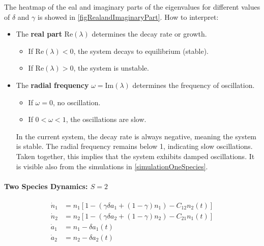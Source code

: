 \documentclass[11pt,a4paper,fleqn]{scrartcl}
\begin{document}
The heatmap of the eal and imaginary parts of the eigenvalues for different values of $\delta$ and $\gamma$ is showed in \ref{figRealandImaginaryPart}.
How to interpret:
\begin{itemize}
    \item The \textbf{real part} $\text{Re}(\lambda)$ determines the decay rate or growth.
        \begin{itemize}
            \item If $\text{Re}(\lambda) < 0$, the system decays to equilibrium (stable).
            \item If $\text{Re}(\lambda) > 0$, the system is unstable.
        \end{itemize}
    \item The \textbf{radial frequency} $\omega = \text{Im}(\lambda)$ determines the frequency of oscillation.
        \begin{itemize}
            \item If $\omega = 0$, no oscillation.
            \item If $0 < \omega < 1$, the oscillations are slow.
        \end{itemize}
In the current system, the decay rate is always negative, meaning the system is stable. The radial frequency remains below 1, indicating slow oscillations. Taken together, this implies that the system exhibits damped oscillations. It is visible also from the simulations in \ref{simulationOneSpecies}.
\end{itemize}


\paragraph{Two Species Dynamics: $S=2$}

\begin{align}
\dot{n}_1 &= n_1 \left[ 1 - \left( \gamma \delta a_1 + (1 - \gamma) n_1 \right) - C_{12} n_2(t) \right] \tag{Species 1} \\
\dot{n}_2 &= n_2\left[ 1 - \left( \gamma \delta a_2 + (1 - \gamma) n_2 \right) - C_{21} n_1(t) \right] \tag{Species 2} \\
\dot{a}_1 &= n_1 - \delta a_1(t) \tag{Autotoxin 1} \\
\dot{a}_2 &= n_2 - \delta a_2(t) \tag{Autotoxin 2}
\end{align}
\end{document}

